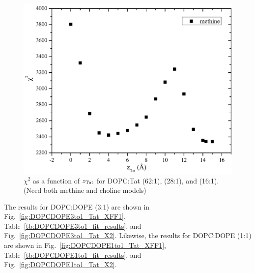 \begin{figure}[htbp]
  \includegraphics[scale=0.3]{figures/Tat/SDP_Results/X2/DOPC_Tat_16to1_3p0_X2}
  \caption{$\chi^2$ as a function of $z_\textrm{Tat}$ for DOPC:Tat (62:1), (28:1), 
  and (16:1). (Need both methine and choline models)}
  \label{fig:DOPC_Tat_X2}
\end{figure}
The results for DOPC:DOPE (3:1) are shown in Fig.~\ref{fig:DOPCDOPE3to1_Tat_XFF1}, 
Table~\ref{tb:DOPCDOPE3to1_fit_results}, and Fig.~\ref{fig:DOPCDOPE3to1_Tat_X2}.
Likewise, the results for DOPC:DOPE (1:1) are shown in 
Fig.~\ref{fig:DOPCDOPE1to1_Tat_XFF1}, Table~\ref{tb:DOPCDOPE1to1_fit_results},
and Fig.~\ref{fig:DOPCDOPE1to1_Tat_X2}.
 
